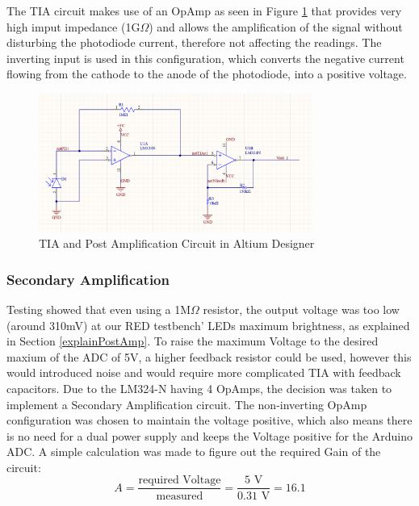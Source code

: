 The \ac{TIA} circuit makes use of an \ac{OpAmp} as seen in Figure \ref{fig:AltiumDis} that provides very high imput impedance (1G$\Omega$) and allows the amplification of the signal without disturbing the photodiode current, therefore not affecting the readings. The inverting input is used in this configuration, which converts the negative current flowing from the cathode to the anode of the photodiode, into a positive voltage.

%
\begin{figure}[htbp] %
    \centering
    \includegraphics[width=0.8\textwidth]{chapters/methodology/prototype/AltiumSingleCircuit.png}
    \caption{TIA and Post Amplification Circuit in Altium Designer}
    \label{fig:AltiumDis}
  \end{figure}
%
%
\subsubsection{Secondary Amplification}
\label{secondAmp}
Testing showed that even using a 1M$\Omega$ resistor, the output voltage was too low (around 310mV) at our \ac{RED} testbench' \acp{LED} maximum brightness, as explained in Section \ref{explainPostAmp}. To raise the maximum Voltage to the desired maxium of the ADC of 5V, a higher feedback resistor could be used, however this would introduced noise and would require more complicated TIA with feedback capacitors. Due to the LM324-N having 4 \acp{OpAmp}, the decision was taken to implement a Secondary Amplification circuit. The non-inverting \ac{OpAmp} configuration was chosen to maintain the voltage positive, which also means there is no need for a dual power supply and keeps the Voltage positive for the Arduino ADC.
A simple calculation was made to figure out the required Gain of the circuit:
\begin{equation} \label{gainCalc}
  A = \frac{\text{required Voltage}}{\text{measured}} = \frac{5\text{ V}}{0.31\text{ V}} = 16.1
  \end{equation}

